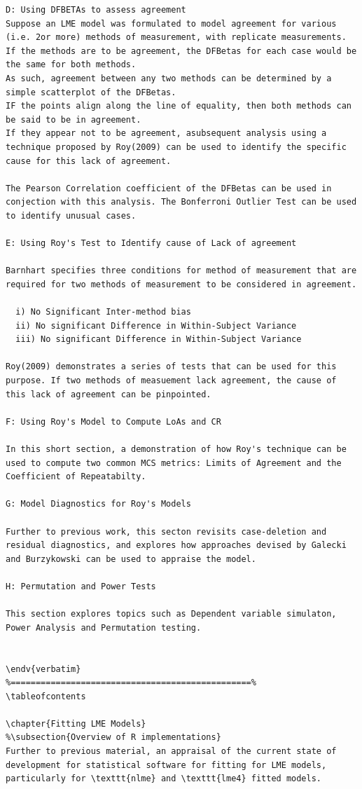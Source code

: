 \documentclass[Main.tex]{subfiles}
\begin{document}
\begin{verbatim}
D: Using DFBETAs to assess agreement
Suppose an LME model was formulated to model agreement for various (i.e. 2or more) methods of measurement, with replicate measurements. If the methods are to be agreement, the DFBetas for each case would be the same for both methods.
As such, agreement between any two methods can be determined by a simple scatterplot of the DFBetas. 
IF the points align along the line of equality, then both methods can be said to be in agreement. 
If they appear not to be agreement, asubsequent analysis using a technique proposed by Roy(2009) can be used to identify the specific cause for this lack of agreement.

The Pearson Correlation coefficient of the DFBetas can be used in conjection with this analysis. The Bonferroni Outlier Test can be used to identify unusual cases.

E: Using Roy's Test to Identify cause of Lack of agreement

Barnhart specifies three conditions for method of measurement that are required for two methods of measurement to be considered in agreement.

  i) No Significant Inter-method bias
  ii) No significant Difference in Within-Subject Variance
  iii) No significant Difference in Within-Subject Variance 

Roy(2009) demonstrates a series of tests that can be used for this purpose. If two methods of measuement lack agreement, the cause of this lack of agreement can be pinpointed.

F: Using Roy's Model to Compute LoAs and CR 

In this short section, a demonstration of how Roy's technique can be used to compute two common MCS metrics: Limits of Agreement and the Coefficient of Repeatabilty.

G: Model Diagnostics for Roy's Models

Further to previous work, this secton revisits case-deletion and residual diagnostics, and explores how approaches devised by Galecki and Burzykowski can be used to appraise the model.

H: Permutation and Power Tests  

This section explores topics such as Dependent variable simulaton, Power Analysis and Permutation testing.


\endv{verbatim}
%================================================%
\tableofcontents
	
\chapter{Fitting LME Models}
%\subsection{Overview of R implementations}
Further to previous material, an appraisal of the current state of development for statistical software for fitting for LME models, particularly for \texttt{nlme} and \texttt{lme4} fitted models.


\end{verbatim}
\end{document}
